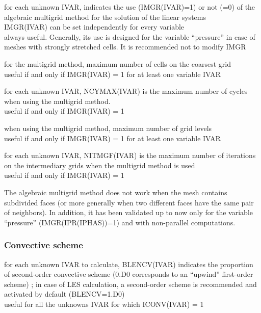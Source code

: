 {for each unknown IVAR, indicates the use (IMGR(IVAR)=1) or not (=0) of the 
algebraic multigrid method for the solution of the linear systems\\
IMGR(IVAR) can be set independently for every variable\\
always useful. Generally, its use is designed for the variable ``pressure'' in
case of meshes with strongly stretched cells. It is recommended not to modify
IMGR}

{for the multigrid method, maximum number of cells on the coarsest grid\\
useful if and only if IMGR(IVAR) = 1 for at least one variable IVAR}

{for each unknown IVAR, NCYMAX(IVAR) is the maximum number of cycles when using
the multigrid method.\\ 
useful if and only if IMGR(IVAR) = 1}

{when using the multigrid method, maximum number of grid levels\\
useful if and only if IMGR(IVAR) = 1 for at least one variable IVAR}

{for each unknown IVAR, NITMGF(IVAR) is the maximum number of iterations on the intermediary
grids when the multigrid method is used\\
useful if and only if IMGR(IVAR) = 1}

The algebraic multigrid method does not work when the mesh contains
subdivided faces (or more generally when two different faces have the
same pair of neighbors). In addition, it has been validated up to now only for
the variable ``pressure'' (IMGR(IPR(IPHAS))=1) and with non-parallel computations.

\subsubsection{Convective scheme}

{for each unknown IVAR to calculate, BLENCV(IVAR) indicates the proportion of 
second-order convective scheme (0.D0 corresponds to an
``upwind'' first-order scheme) ; in case of LES calculation, a
second-order scheme is recommended and activated by default (BLENCV=1.D0)\\
useful for all the unknowns IVAR for which ICONV(IVAR) = 1}

